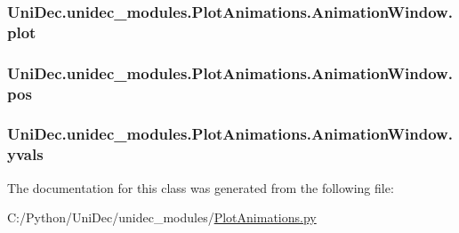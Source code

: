 \subsubsection[{plot}]{\setlength{\rightskip}{0pt plus 5cm}Uni\+Dec.\+unidec\+\_\+modules.\+Plot\+Animations.\+Animation\+Window.\+plot}\label{class_uni_dec_1_1unidec__modules_1_1_plot_animations_1_1_animation_window_a0e13e933efdf449ab1bb4029f9c7d59f}
\hypertarget{class_uni_dec_1_1unidec__modules_1_1_plot_animations_1_1_animation_window_a29f6a6c8ac99643984bad06eae2f47ae}{}
\subsubsection[{pos}]{\setlength{\rightskip}{0pt plus 5cm}Uni\+Dec.\+unidec\+\_\+modules.\+Plot\+Animations.\+Animation\+Window.\+pos}\label{class_uni_dec_1_1unidec__modules_1_1_plot_animations_1_1_animation_window_a29f6a6c8ac99643984bad06eae2f47ae}
\hypertarget{class_uni_dec_1_1unidec__modules_1_1_plot_animations_1_1_animation_window_af8995df5d3e0c816ddce976803d29206}{}
\subsubsection[{yvals}]{\setlength{\rightskip}{0pt plus 5cm}Uni\+Dec.\+unidec\+\_\+modules.\+Plot\+Animations.\+Animation\+Window.\+yvals}\label{class_uni_dec_1_1unidec__modules_1_1_plot_animations_1_1_animation_window_af8995df5d3e0c816ddce976803d29206}


The documentation for this class was generated from the following file\+:\begin{DoxyCompactItemize}
\item 
C\+:/\+Python/\+Uni\+Dec/unidec\+\_\+modules/\hyperlink{_plot_animations_8py}{Plot\+Animations.\+py}\end{DoxyCompactItemize}
